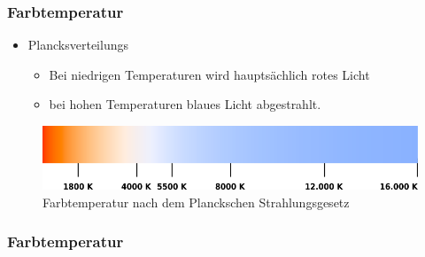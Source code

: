 \documentclass{beamer}
\begin{document}
\begin{frame}[t]\frametitle{Farbtemperatur}
\begin{itemize}
  \item Plancksverteilungs
  \begin{itemize}
  \item \small Bei niedrigen Temperaturen wird hauptsächlich rotes Licht
  \item \small bei hohen Temperaturen blaues Licht abgestrahlt.
\end{itemize}
\pause
\end{itemize}

\begin{figure}[!h]
\centering
      \includegraphics[width=\textwidth]{pics/ct.png}
      \caption*{\footnotesize Farbtemperatur nach dem Planckschen Strahlungsgesetz}
 \end{figure}

\end{frame}

   \begin{frame}[t]\frametitle{Farbtemperatur}
       
   

\begin{table}[!h]
\centering
{}

\caption*{Beispiele für Farbtemperaturen}
\end{table}

   
   \end{frame}
\end{document}
